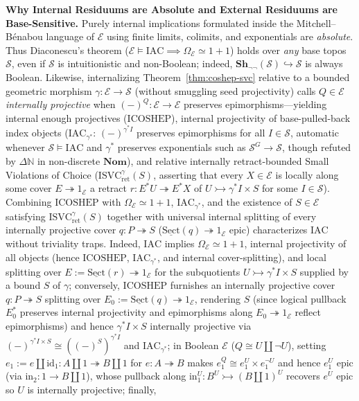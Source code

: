 \textbf{Why Internal Residuums are Absolute and External Residuums are Base-Sensitive.} Purely internal implications formulated inside the Mitchell--Bénabou language of $\mathcal{E}$ using finite limits, colimits, and exponentials are \emph{absolute}. Thus Diaconescu's theorem ($\mathcal{E} \models \mathrm{IAC} \implies \Omega_{\mathcal{E}} \simeq 1+1$) holds over \emph{any} base topos $\mathcal{S}$, even if $\mathcal{S}$ is intuitionistic and non-Boolean; indeed, $\mathbf{Sh}_{\neg\neg}(\mathcal{S}) \hookrightarrow \mathcal{S}$ is always Boolean. Likewise, internalizing Theorem~\ref{thm:coshep-svc} relative to a bounded geometric morphism $\gamma : \mathcal{E} \to \mathcal{S}$ (without smuggling seed projectivity) calls $Q \in \mathcal{E}$ \emph{internally projective} when $(-)^Q : \mathcal{E} \to \mathcal{E}$ preserves epimorphisms---yielding internal enough projectives ($\mathrm{ICOSHEP}$), internal projectivity of base-pulled-back index objects ($\mathrm{IAC}_{\gamma^*}$: $(-)^{\gamma^* I}$ preserves epimorphisms for all $I \in \mathcal{S}$, automatic whenever $\mathcal{S} \models \mathrm{IAC}$ and $\gamma^*$ preserves exponentials such as $\mathcal{S}^G \to \mathcal{S}$, though refuted by $\Delta\mathbb{N}$ in non-discrete $\mathbf{Nom}$), and relative internally retract-bounded Small Violations of Choice ($\mathrm{ISVC}_{\mathrm{ret}}^{\gamma}(S)$, asserting that every $X \in \mathcal{E}$ is locally along some cover $E \twoheadrightarrow 1_{\mathcal{E}}$ a retract $r : E^* U \twoheadrightarrow E^* X$ of $U \rightarrowtail \gamma^* I \times S$ for some $I \in \mathcal{S}$). Combining $\mathrm{ICOSHEP}$ with $\Omega_{\mathcal{E}} \simeq 1+1$, $\mathrm{IAC}_{\gamma^*}$, and the existence of $S \in \mathcal{E}$ satisfying $\mathrm{ISVC}_{\mathrm{ret}}^{\gamma}(S)$ together with universal internal splitting of every internally projective cover $q : P \twoheadrightarrow S$ ($\underline{\mathrm{Sect}}(q) \twoheadrightarrow 1_{\mathcal{E}}$ epic) characterizes $\mathrm{IAC}$ without triviality traps. Indeed, $\mathrm{IAC}$ implies $\Omega_{\mathcal{E}} \simeq 1+1$, internal projectivity of all objects (hence $\mathrm{ICOSHEP}$, $\mathrm{IAC}_{\gamma^*}$, and internal cover-splitting), and local splitting over $E := \underline{\mathrm{Sect}}(r) \twoheadrightarrow 1_{\mathcal{E}}$ for the subquotients $U \rightarrowtail \gamma^* I \times S$ supplied by a bound $S$ of $\gamma$; conversely, $\mathrm{ICOSHEP}$ furnishes an internally projective cover $q : P \twoheadrightarrow S$ splitting over $E_0 := \underline{\mathrm{Sect}}(q) \twoheadrightarrow 1_{\mathcal{E}}$, rendering $S$ (since logical pullback $E_0^*$ preserves internal projectivity and epimorphisms along $E_0 \twoheadrightarrow 1_{\mathcal{E}}$ reflect epimorphisms) and hence $\gamma^* I \times S$ internally projective via $(-)^{\gamma^* I \times S} \cong ((-)^S)^{\gamma^* I}$ and $\mathrm{IAC}_{\gamma^*}$; in Boolean $\mathcal{E}$ ($Q \cong U \amalg \neg U$), setting $e_1 := e \amalg \mathrm{id}_1 : A \amalg 1 \twoheadrightarrow B \amalg 1$ for $e : A \twoheadrightarrow B$ makes $e_1^Q \cong e_1^U \times e_1^{\neg U}$ and hence $e_1^U$ epic (via $\mathrm{in}_2 : 1 \to B \amalg 1$), whose pullback along $\mathrm{in}_1^U : B^U \rightarrowtail (B \amalg 1)^U$ recovers $e^U$ epic so $U$ is internally projective; finally, 